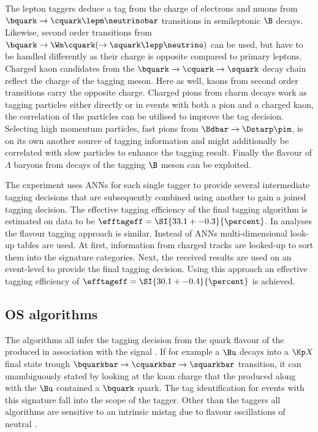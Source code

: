 The lepton taggers deduce a tag from the charge of electrons and muons from
$\bquark \to \cquark \lepm \neutrinobar$ transitions in semileptonic $\B$
decays. Likewise, second order transitions from $\bquark \to \Wm \cquark ( \to
\squark \lepp \neutrino )$ can be used, but have to be handled differently as
their charge is opposite compared to primary leptons. Charged kaon candidates
from the $\bquark \to \cquark \to \squark$ decay chain reflect the charge of the
tagging meson. Here as well, kaons from second order transitions carry the
opposite charge. Charged pions from charm decays work as tagging particles
either directly or in events with both a pion and a charged kaon, the
correlation of the particles can be utilised to improve the tag decision.
Selecting high momentum particles, \eg fast pions from $\Bdbar \to \Dstarp
\pim$, is on its own another source of tagging information and might
additionally be correlated with slow particles to enhance the tagging result.
Finally the flavour of $\Lambda$ baryons from decays of the tagging $\B$ meson
can be exploited.

The \Babar experiment uses \acp{ANN} for each single tagger to provide several
intermediate tagging decisions that are subsequently combined using another \ANN
to gain a joined tagging decision. The effective tagging efficiency of the final
\Babar tagging algorithm is estimated on data to be $\efftageff = \SI{33.1 +-
0.3}{\percent}$. In \Belle analyses the flavour tagging approach is similar.
Instead of \acp{ANN} multi-dimensional look-up tables are used. At first,
information from charged tracks are looked-up to sort them into the signature
categories. Next, the received results are used on an event-level to provide the
final tagging decision. Using this approach an effective tagging efficiency of
$\efftageff = \SI{30.1 +- 0.4}{\percent}$ is achieved.

\subsection{\Acl{OS} algorithms}
\label{sec:flavour_tagging:os}

The \OS algorithms all infer the tagging decision from the quark flavour of the
\bhadron produced in association with the signal \Bmeson. If for example a $\Bu$
decays into a $\Kp X$ final state trough $\bquarkbar \to \cquarkbar \to
\squarkbar$ transition, it can unambiguously stated by looking at the kaon
charge that the \bhadron produced along with the $\Bu$ contained a $\bquark$
quark. The tag identification for events with this signature fall into the scope
of the \OSK tagger. Other than the \SS taggers all \OS algorithms are sensitive
to an intrinsic mistag due to flavour oscillations of neutral \Bmesons.

